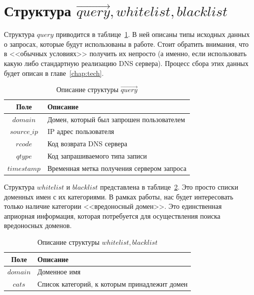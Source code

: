 \documentclass[a4paper,14pt]{extreport} %
\begin{document}
\section{Структура $\vec{query}, whitelist, blacklist$}
Структура $query$ приводится в таблице~\ref{tab:ql}. В ней описаны типы исходных данных о запросах, которые будут использованы в работе. Стоит обратить внимания, что в <<обычных условиях>> получить их непросто (а именно, если использовать какую либо стандартную реализацию DNS сервера). Процесс сбора этих данных будет описан в главе~\ref{chap:tech}.
\label{sec:strq}
\begin{table}[H]
	\centering
	\caption{Описание структуры $\vec{query}$}\label{tab:ql}
	\begin{tabular}{| c | l |}
		\hline
		Поле     & Описание                                                                 \\ \hline
		$domain$     & Домен, который был запрошен пользователем    \\ \hline 
		$source\_ip$ & IP адрес пользователя                                           \\ \hline
		$rcode$      & Код возврата DNS сервера                                       \\ \hline
		$qtype$      & Код запрашиваемого типа записи                        \\ \hline
		$timestamp$  & Временная метка получения сервером запроса \\ \hline
				
	\end{tabular}
\end{table}


Структура $whitelist$ и $blacklist$ представлена в таблице~\ref{tab:bw}. Это просто списки доменных имен с их категориями. В рамках работы, нас будет интересовать только наличие категории <<вредоносный домен>>. Это единственная априорная информация, которая потребуется для осуществления поиска вредоносных доменов.
\begin{table}[H]
	\centering
	\caption{Описание структуры $whitelist, blacklist$}\label{tab:bw}
	\begin{tabular}{| c | l |}
		\hline
		Поле & Описание                                                                     \\ \hline
		$domain$ & Доменное имя                                                              \\ \hline 
		$cats$   & Список категорий, к которым принадлежит домен \\ \hline
				
	\end{tabular}
\end{table}
\end{document}
